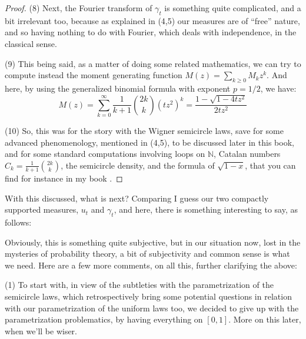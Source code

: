 \documentclass[12pt]{amsbook}
\newtheorem{comment}[theorem]{Comment}
\begin{document}
\begin{proof}
\medskip

(8) Next, the Fourier transform of $\gamma_t$ is something quite complicated, and a bit irrelevant too, because as explained in (4,5) our measures are of ``free'' nature, and so having nothing to do with Fourier, which deals with independence, in the classical sense.

\medskip

(9) This being said, as a matter of doing some related mathematics, we can try to compute instead the moment generating function $M(z)=\sum_{k\geq0}M_kz^k$. And here, by using the generalized binomial formula with exponent $p=1/2$, we have:
$$M(z)=\sum_{k=0}^\infty\frac{1}{k+1}\binom{2k}{k}(tz^2)^k
=\frac{1-\sqrt{1-4tz^2}}{2tz^2}$$

(10) So, this was for the story with the Wigner semicircle laws, save for some advanced phenomenology, mentioned in (4,5), to be discussed later in this book, and for some standard computations involving loops on $\mathbb N$, Catalan numbers $C_k=\frac{1}{k+1}\binom{2k}{k}$, the semicircle density, and the formula of $\sqrt{1-x}$, that you can find for instance in my book \cite{ba2}.
\end{proof}

With this discussed, what is next? Comparing I guess our two compactly supported measures, $u_t$ and $\gamma_t$, and here, there is something interesting to say, as follows:

Obviously, this is something quite subjective, but in our situation now, lost in the mysteries of probability theory, a bit of subjectivity and common sense is what we need. Here are a few more comments, on all this, further clarifying the above:

\bigskip

(1) To start with, in view of the subtleties with the parametrization of the semicircle laws, which retrospectively bring some potential questions in relation with our parametrization of the uniform laws too, we decided to give up with the parametrization problematics, by having everything on $[0,1]$. More on this later, when we'll be wiser.
\end{document}
